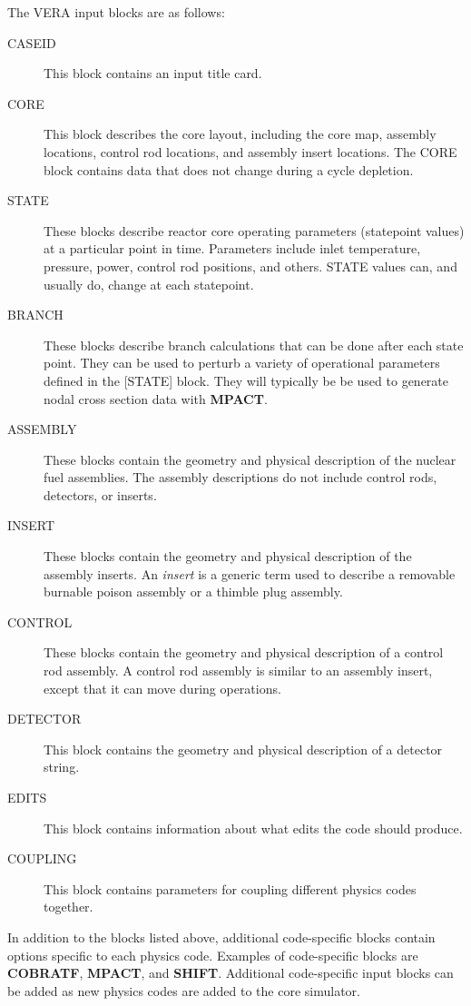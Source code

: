 \documentclass{vera-ornltm}
\begin{document}
The VERA input blocks are as follows:
\begin{description}
\item[CASEID] This block contains an input title card.
\item[CORE] This block describes the core layout, including the core map, assembly locations,
  control rod locations, and assembly insert locations. The CORE block contains data that does not change
  during a cycle depletion.
\item[STATE] These blocks describe reactor core operating parameters (statepoint values)
  at a particular point in time.
  Parameters include inlet temperature, pressure, power, control rod positions, and others.
  STATE values can, and usually do, change at each statepoint.
\item[BRANCH] These blocks describe branch calculations that can be done after each state point.
  They can be used to perturb a variety of operational parameters defined in the [STATE] block.
  They will typically be be used to generate nodal cross section data with {\bf MPACT}.
\item[ASSEMBLY] These blocks contain the geometry and physical description of the nuclear fuel assemblies.
  The assembly descriptions do not include control rods, detectors, or inserts.
\item[INSERT] These blocks contain the geometry and physical description of the assembly inserts.
   An \textit{insert} is a generic term used to describe a removable burnable poison assembly or a thimble plug assembly.
\item[CONTROL] These blocks contain the geometry and physical description of a control rod assembly.
   A control rod assembly is similar to an assembly insert, except that it can move
   during operations.
\item[DETECTOR] This block contains the geometry and physical description of a detector string.
\item[EDITS] This block contains information about what edits the code should produce.
\item[COUPLING] This block contains parameters for coupling different physics codes together.
\end{description}

In addition to the blocks listed above, additional code-specific blocks contain
options specific to each physics code.
Examples of code-specific blocks are {\bf COBRATF}, {\bf MPACT}, and {\bf SHIFT}.
Additional code-specific input blocks can be added as new physics codes are added to the core simulator.
\end{document}
